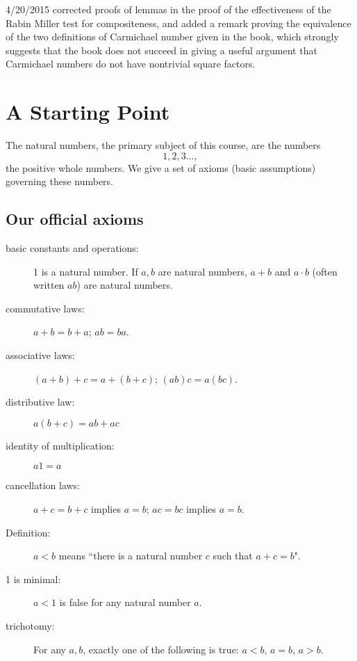 \documentclass[12pt]{article}
\begin{document}
4/20/2015 corrected proofs of lemmas in the proof of the effectiveness of the Rabin Miller test for compositeness, and added a remark proving the equivalence of the two definitions of Carmichael number given in the book, which strongly suggests that the book does not succeed in giving a useful argument that Carmichael numbers do not have nontrivial square factors.

\tableofcontents

\newpage

\section{A Starting Point}

The natural numbers, the primary subject of this course, are the numbers $$1,2,3\ldots, $$  the positive whole numbers.
We give a set of axioms (basic assumptions) governing these numbers.

\subsection{Our official axioms}

\begin{description}

\item[basic constants and operations:]  1 is a natural number.  If $a,b$ are natural numbers, $a+b$ and $a\cdot b$ (often written $ab$) are natural numbers.

\item[commutative laws:]  $a+b=b+a$; $ab=ba$. 

\item[associative laws:]  $(a+b)+c=a+(b+c)$;  $(ab)c=a(bc)$.

\item[distributive law:]  $a(b+c)=ab+ac$

\item[identity of multiplication:]  $a1=a$

\item[cancellation laws:]  $a+c=b+c$ implies $a=b$;  $ac=bc$ implies $a=b$.

\item[Definition:]  $a<b$ means ``there is a natural number $c$ such that $a+c=b$".

\item[1 is minimal:]  $a<1$ is false for any natural number $a$.

\item[trichotomy:]  For any $a,b$, exactly one of the following is true:  $a<b$, $a=b$, $a>b$.

\end{description}
\end{document}
